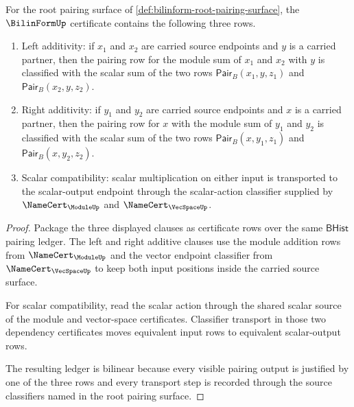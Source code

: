 \begin{theorem}
\label{thm:bilinform-root-bilinearity-rows}
For the root pairing surface of \autoref{def:bilinform-root-pairing-surface}, the $\BilinFormUp$ certificate contains the following three rows.
\begin{enumerate}
\item Left additivity: if $x_{1}$ and $x_{2}$ are carried source endpoints and $y$ is a carried partner, then the pairing row for the module sum of $x_{1}$ and $x_{2}$ with $y$ is classified with the scalar sum of the two rows $\mathsf{Pair}_{B}(x_{1},y,z_{1})$ and $\mathsf{Pair}_{B}(x_{2},y,z_{2})$.
\item Right additivity: if $y_{1}$ and $y_{2}$ are carried source endpoints and $x$ is a carried partner, then the pairing row for $x$ with the module sum of $y_{1}$ and $y_{2}$ is classified with the scalar sum of the two rows $\mathsf{Pair}_{B}(x,y_{1},z_{1})$ and $\mathsf{Pair}_{B}(x,y_{2},z_{2})$.
\item Scalar compatibility: scalar multiplication on either input is transported to the scalar-output endpoint through the scalar-action classifier supplied by $\NameCert_{\ModuleUp}$ and $\NameCert_{\VecSpaceUp}$.
\end{enumerate}
\end{theorem}
\begin{proof}
Package the three displayed clauses as certificate rows over the same $\mathsf{BHist}$ pairing ledger. The left and right additive clauses use the module addition rows from $\NameCert_{\ModuleUp}$ and the vector endpoint classifier from $\NameCert_{\VecSpaceUp}$ to keep both input positions inside the carried source surface.

For scalar compatibility, read the scalar action through the shared scalar source of the module and vector-space certificates. Classifier transport in those two dependency certificates moves equivalent input rows to equivalent scalar-output rows.

The resulting ledger is bilinear because every visible pairing output is justified by one of the three rows and every transport step is recorded through the source classifiers named in the root pairing surface.
\end{proof}


